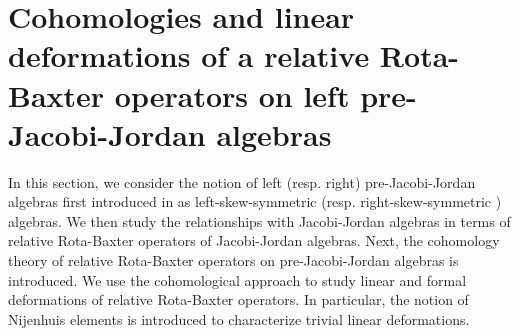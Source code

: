 \documentclass[12pt]{amsart}
\begin{document}
	\section{Cohomologies and linear deformations of a relative Rota-Baxter operators on left pre-Jacobi-Jordan algebras}
	In this section, we consider the notion of left (resp. right) pre-Jacobi-Jordan algebras first introduced in \cite{absb} as left-skew-symmetric (resp. right-skew-symmetric ) algebras. We then study  the relationships with Jacobi-Jordan algebras in terms of relative Rota-Baxter operators of Jacobi-Jordan algebras. 	Next, the cohomology theory of relative Rota-Baxter operators on pre-Jacobi-Jordan algebras is introduced. We use the cohomological approach to study linear and formal deformations of relative Rota-Baxter operators. In particular, the notion of Nijenhuis elements is introduced to characterize trivial linear deformations. 
	
\end{document}
